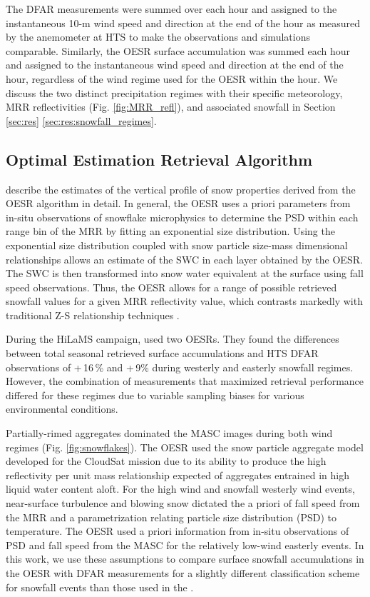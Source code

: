 \documentclass{ametsocV5}
\begin{document}
		The DFAR measurements were summed over each hour and assigned to the instantaneous 10-m wind speed and direction at the end of the hour as measured by the anemometer at HTS to make the observations and simulations comparable. Similarly, the OESR surface accumulation was summed each hour and assigned to the instantaneous wind speed and direction at the end of the hour, regardless of the wind regime used for the OESR within the hour. We discuss the two distinct precipitation regimes with their specific meteorology, MRR reflectivities (Fig. \ref{fig:MRR_refl}), and associated snowfall in Section \ref{sec:res} \ref{sec:res:snowfall_regimes}.

	\subsection{Optimal Estimation Retrieval Algorithm}\label{sec:methodology:oesr}
		\citet{schirle_estimation_2019} describe the estimates of the vertical profile of snow properties derived from the OESR algorithm in detail. In general, the OESR uses a priori parameters from in-situ observations of snowflake microphysics to determine the PSD within each range bin of the MRR by fitting an exponential size distribution. Using the exponential size distribution coupled with snow particle size-mass dimensional relationships allows an estimate of the SWC in each layer obtained by the OESR. The SWC is then transformed into snow water equivalent at the surface using fall speed observations. Thus, the OESR allows for a range of possible retrieved snowfall values for a given MRR reflectivity value, which contrasts markedly with traditional Z-S relationship techniques \citep{friedrich_quantifying_2020}.  
		
		During the HiLaMS campaign, \citet{schirle_estimation_2019} used two OESRs. They found the differences between total seasonal retrieved surface accumulations and HTS DFAR observations of +\,16\,\% and +\,9\% during westerly and easterly snowfall regimes. However, the combination of measurements that maximized retrieval performance differed for these regimes due to variable sampling biases for various environmental conditions. 
		
		Partially-rimed aggregates dominated the MASC images during both wind regimes (Fig. \ref{fig:snowflakes}). The OESR used the snow particle aggregate model \citep{wood_microphysical_2015} developed for the CloudSat mission due to its ability to produce the high reflectivity per unit mass relationship expected of aggregates entrained in high liquid water content aloft. For the high wind and snowfall westerly wind events, near-surface turbulence and blowing snow dictated the a priori of fall speed from the MRR and a parametrization relating particle size distribution (PSD) to temperature. The OESR used a priori information from in-situ observations of PSD and fall speed from the MASC for the relatively low-wind easterly events. In this work, we use these assumptions to compare surface snowfall accumulations in the OESR with DFAR measurements for a slightly different classification scheme for snowfall events than those used in the \citet{schirle_estimation_2019}. 
		
\end{document}
